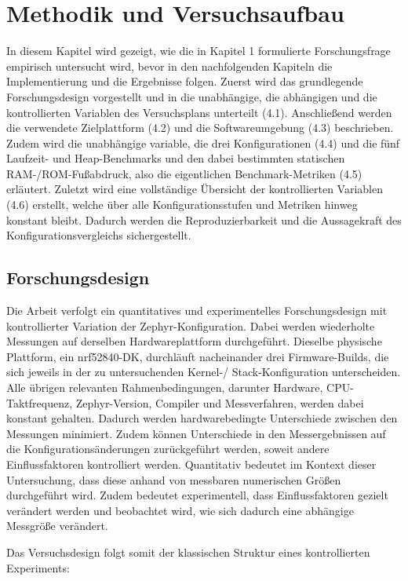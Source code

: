 \chapter{Methodik und Versuchsaufbau}

In diesem Kapitel wird gezeigt, wie die in Kapitel 1 formulierte Forschungsfrage empirisch untersucht wird, bevor in den nachfolgenden Kapiteln die Implementierung und die Ergebnisse folgen. Zuerst wird das grundlegende Forschungsdesign vorgestellt und in die unabhängige, die abhängigen und die kontrollierten Variablen des Versuchsplans unterteilt (4.1). Anschließend werden die verwendete Zielplattform (4.2) und die Softwareumgebung (4.3) beschrieben. Zudem wird die unabhängige variable, die drei Konfigurationen (4.4) und die fünf Laufzeit- und Heap-Benchmarks und den dabei bestimmten statischen RAM-/ROM-Fußabdruck, also die eigentlichen Benchmark-Metriken (4.5) erläutert. Zuletzt wird eine vollständige Übersicht der kontrollierten Variablen (4.6) erstellt, welche über alle Konfigurationsstufen und Metriken hinweg konstant bleibt. Dadurch werden die Reproduzierbarkeit und die Aussagekraft des Konfigurationsvergleichs sichergestellt.

\section{Forschungsdesign}
Die Arbeit verfolgt ein quantitatives und experimentelles Forschungsdesign mit kontrollierter Variation der Zephyr-Konfiguration. Dabei werden wiederholte Messungen auf derselben Hardwareplattform durchgeführt. Dieselbe physische Plattform, ein nrf52840-DK, durchläuft nacheinander drei Firmware-Builds, die sich jeweils in der zu untersuchenden Kernel-/ Stack-Konfiguration unterscheiden. Alle übrigen relevanten Rahmenbedingungen, darunter Hardware, CPU-Taktfrequenz, Zephyr-Version, Compiler und Messverfahren, werden dabei konstant gehalten. Dadurch werden hardwarebedingte Unterschiede zwischen den Messungen minimiert. Zudem können Unterschiede in den Messergebnissen auf die Konfigurationsänderungen zurückgeführt werden, soweit andere Einflussfaktoren kontrolliert werden. Quantitativ bedeutet im Kontext dieser Untersuchung, dass diese anhand von messbaren numerischen Größen durchgeführt wird. Zudem bedeutet experimentell, dass Einflussfaktoren gezielt verändert werden und beobachtet wird, wie sich dadurch eine abhängige Messgröße verändert.

Das Versuchsdesign folgt somit der klassischen Struktur eines kontrollierten Experiments:


